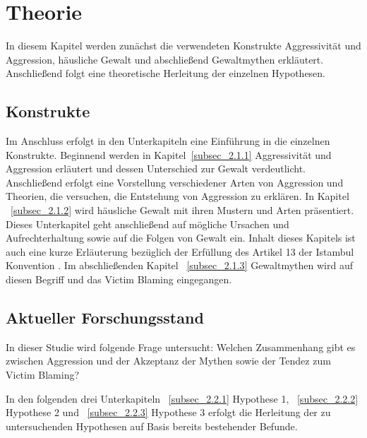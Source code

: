 

\chapter{Theorie}   \label{ch_2}
In diesem Kapitel werden zunächst die verwendeten Konstrukte Aggressivität und Aggression, häusliche Gewalt und abschließend Gewaltmythen erkläutert. Anschließend folgt eine theoretische Herleitung der einzelnen Hypothesen.

\section{Konstrukte}    \label{sec_2.1}
Im Anschluss erfolgt in den Unterkapiteln eine Einführung in die einzelnen Konstrukte. Beginnend werden in Kapitel~\ref{subsec_2.1.1} Aggressivität und Aggression erläutert und dessen Unterschied zur Gewalt verdeutlicht. Anschließend erfolgt eine Vorstellung verschiedener Arten von Aggression und Theorien, die versuchen, die Entstehung von Aggression zu erklären. In Kapitel ~\ref{subsec_2.1.2} wird häusliche Gewalt mit ihren Mustern und Arten präsentiert. Dieses Unterkapitel geht anschließend auf mögliche Ursachen und Aufrechterhaltung sowie auf die Folgen von Gewalt ein. Inhalt dieses Kapitels ist auch eine kurze Erläuterung bezüglich der Erfüllung des Artikel 13 der Istambul Konvention \parencite{Istambul_Konvention}. Im abschließenden Kapitel ~\ref{subsec_2.1.3} Gewaltmythen wird auf diesen Begriff und das Victim Blaming eingegangen.





\section{Aktueller Forschungsstand}   \label{sec_2.2}
In dieser Studie wird folgende Frage untersucht: Welchen Zusammenhang gibt es zwischen Aggression und der Akzeptanz der Mythen sowie der Tendez zum Victim Blaming? 

In den folgenden drei Unterkapiteln ~\ref{subsec_2.2.1} Hypothese 1, ~\ref{subsec_2.2.2} Hypothese 2 und ~\ref{subsec_2.2.3} Hypothese 3 erfolgt die Herleitung der zu untersuchenden Hypothesen auf Basis bereits bestehender Befunde.



